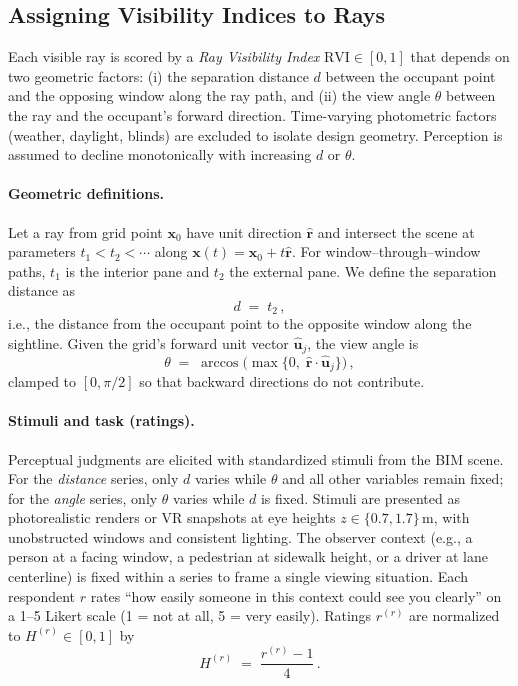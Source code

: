 \documentclass[final,3p,times,review]{elsarticle}
\begin{document}
\subsection{Assigning Visibility Indices to Rays}
\label{sec:rvi}
Each visible ray is scored by a \emph{Ray Visibility Index} $\mathrm{RVI}\in[0,1]$ that depends on two geometric factors: (i) the separation distance $d$ between the occupant point and the opposing window along the ray path, and (ii) the view angle $\theta$ between the ray and the occupant’s forward direction. Time-varying photometric factors (weather, daylight, blinds) are excluded to isolate design geometry. Perception is assumed to decline monotonically with increasing $d$ or $\theta$.

\paragraph{Geometric definitions.}
Let a ray from grid point $\mathbf{x}_0$ have unit direction $\hat{\mathbf{r}}$ and intersect the scene at parameters $t_1<t_2<\cdots$ along $\mathbf{x}(t)=\mathbf{x}_0+t\hat{\mathbf{r}}$. For window–through–window paths, $t_1$ is the interior pane and $t_2$ the external pane. We define the separation distance as
\begin{equation}
d \;=\; t_2 \,,
\label{eq:def-distance}
\end{equation}
i.e., the distance from the occupant point to the opposite window along the sightline. Given the grid’s forward unit vector $\hat{\mathbf{u}}_j$, the view angle is
\begin{equation}
\theta \;=\; \arccos\!\big(\max\{0,\;\hat{\mathbf{r}}\!\cdot\!\hat{\mathbf{u}}_j\}\big)\,,
\label{eq:def-angle}
\end{equation}
clamped to $[0,\pi/2]$ so that backward directions do not contribute.

\paragraph{Stimuli and task (ratings).}
Perceptual judgments are elicited with standardized stimuli from the BIM scene. For the \emph{distance} series, only $d$ varies while $\theta$ and all other variables remain fixed; for the \emph{angle} series, only $\theta$ varies while $d$ is fixed. Stimuli are presented as photorealistic renders or VR snapshots at eye heights $z\in\{0.7,1.7\}$\,m, with unobstructed windows and consistent lighting. The observer context (e.g., a person at a facing window, a pedestrian at sidewalk height, or a driver at lane centerline) is fixed within a series to frame a single viewing situation. Each respondent $r$ rates “how easily someone in this context could see you clearly” on a 1–5 Likert scale (1 = not at all, 5 = very easily). Ratings $r^{(r)}$ are normalized to $H^{(r)}\in[0,1]$ by
\begin{equation}
H^{(r)} \;=\; \frac{r^{(r)}-1}{4}\,.
\label{eq:rating-normalization}
\end{equation}
\end{document}

